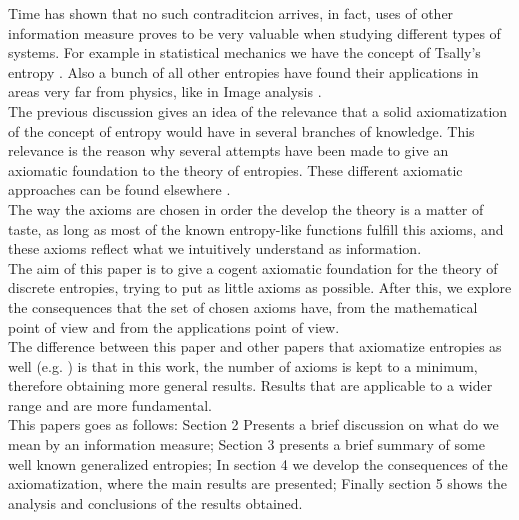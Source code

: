 \documentclass[11pt]{article}
\theoremstyle{plain}
\begin{document}
Time has shown that no such contraditcion arrives, in fact, uses
of other information measure proves to be very valuable when
studying different types of systems. For example in statistical
mechanics we have the concept of Tsally's entropy \cite{Tsallis2,
Tsallis3,Tsallis1, Gellmann}. Also a bunch of all other entropies
have found their applications in areas very far from physics, like
in Image analysis \cite{Kappur}.
\\
The previous discussion gives an idea of the relevance that a solid axiomatization of the concept of entropy  would have in several branches of knowledge. This relevance is the reason why several attempts have been made to  give an axiomatic foundation to the theory of entropies. These different axiomatic approaches can be found elsewhere \cite{Ochs,Csizar, Characterizing, Aczel} . 
\medskip
\\
The way the axioms are chosen in order the develop the theory is a matter of taste, as long as most of the known entropy-like  functions fulfill this
axioms, and these axioms reflect what we intuitively understand as information. 
\\
The aim of this paper is to give a cogent axiomatic foundation for
the theory of discrete entropies, trying to put as little axioms as possible. After this, we  explore the consequences that the set of chosen  axioms have,  from the mathematical point of view and from the applications point of view.
\medskip
\\
The difference between this paper and other papers that axiomatize
entropies as well (e.g. \cite{Dupuis, Csizar}) is that in this work, the
number of axioms is kept to a minimum, therefore obtaining more
general results. Results that are applicable to a wider range and
are more fundamental.
\medskip
\\
This papers goes as follows:  Section 2 Presents a brief discussion on what do we mean by an information measure; Section 3 presents a brief summary of some well known generalized entropies; In section 4 we develop the consequences
of the axiomatization, where the main results are presented;
Finally section 5 shows the analysis and conclusions of the results obtained.
\end{document}
